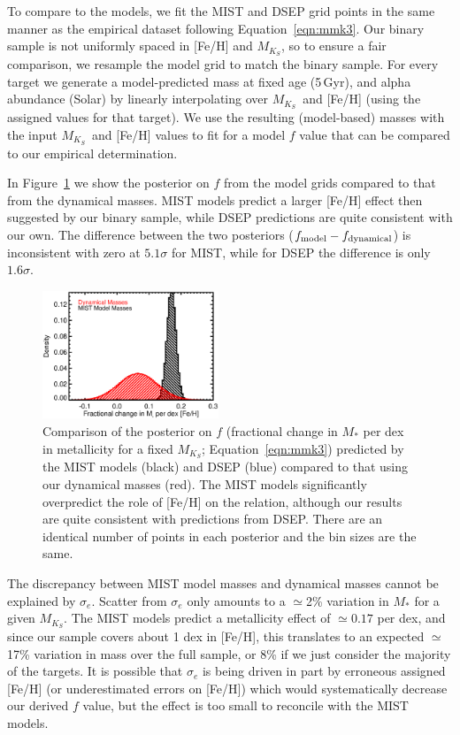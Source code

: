 \documentclass[twocolumn]{aastex62}
\newcommand{\mks}{$M_{K_S}$}
\begin{document}
To compare to the models, we fit the MIST and DSEP grid points in the same manner as the empirical dataset following Equation~\ref{eqn:mmk3}. Our binary sample is not uniformly spaced in [Fe/H] and \mks, so to ensure a fair comparison, we resample the model grid to match the binary sample. For every target we generate a model-predicted mass at fixed age (5\,Gyr), and alpha abundance (Solar) by linearly interpolating over \mks\ and [Fe/H] (using the assigned values for that target). We use the resulting (model-based) masses with the input \mks\ and [Fe/H] values to fit for a model $f$ value that can be compared to our empirical determination.

In Figure~\ref{fig:f} we show the posterior on $f$ from the model grids compared to that from the dynamical masses. MIST models predict a larger [Fe/H] effect then suggested by our binary sample, while DSEP predictions are quite consistent with our own. The difference between the two posteriors ($f_{\rm{model}}-f_{\rm{dynamical}}$) is inconsistent with zero at $5.1\sigma$ for MIST, while for DSEP the difference is only $1.6\sigma$. 

\begin{figure}[htp]
\begin{center}
\includegraphics[width=0.47\textwidth]{F_plot.eps}
\caption{Comparison of the posterior on $f$ (fractional change in $M_*$ per dex in metallicity for a fixed \mks; Equation~\ref{eqn:mmk3}) predicted by the MIST models (black) and DSEP (blue) compared to that using our dynamical masses (red). The MIST models significantly overpredict the role of [Fe/H] on the relation, although our results are quite consistent with predictions from DSEP. There are an identical number of points in each posterior and the bin sizes are the same. }
\label{fig:f}
\end{center}
\end{figure}

The discrepancy between MIST model masses and dynamical masses cannot be explained by $\sigma_e$. Scatter from $\sigma_e$ only amounts to a $\simeq$2\% variation in $M_*$ for a given \mks. The MIST models predict a metallicity effect of $\simeq0.17$ per dex, and since our sample covers about 1 dex in [Fe/H], this translates to an expected $\simeq$17\% variation in mass over the full sample, or 8\% if we just consider the majority of the targets. It is possible that $\sigma_e$ is being driven in part by erroneous assigned [Fe/H] (or underestimated errors on [Fe/H]) which would systematically decrease our derived $f$ value, but the effect is too small to reconcile with the MIST models. 
\end{document}
